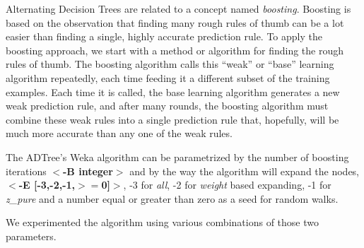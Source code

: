 \documentclass[a4paper]{llncs}
\begin{document}
Alternating Decision Trees are related to a concept named \textit{boosting}.
Boosting is based on the observation that finding many rough rules of thumb can be a lot easier 
than finding a single, highly accurate prediction rule. To apply the boosting approach,
we start with a method or algorithm for finding the rough rules of thumb. 
The boosting algorithm calls this “weak” or “base” learning algorithm repeatedly, 
each time feeding it a different subset of the training examples. Each time 
it is called, the base learning algorithm generates a new weak prediction rule, and 
after many rounds, the boosting algorithm must combine these weak rules into a 
single prediction rule that, hopefully, will be much more accurate than any one of 
the weak rules. \cite{boosting}

The ADTree's Weka algorithm can be parametrized by the number of boosting iterations
\textbf{$<$-B integer$>$} and by the way the algorithm will expand the nodes,
\textbf{$<$-E [-3,-2,-1,$>=$0]$>$},
-3 for \textit{all}, -2 for \textit{weight} based expanding,
-1 for \textit{z\_pure} and a number
equal or greater than zero as a seed for random walks.

We experimented the algorithm using various combinations of those two parameters.
\end{document}
